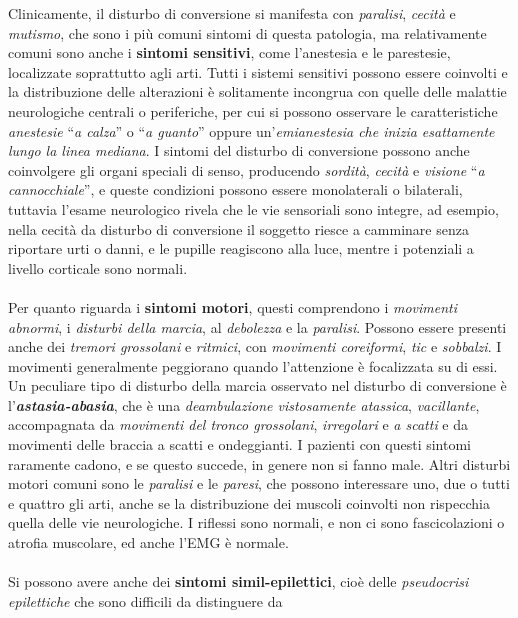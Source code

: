 Clinicamente, il disturbo di conversione si manifesta con
\emph{paralisi}, \emph{cecità} e \emph{mutismo}, che sono i più comuni
sintomi di questa patologia, ma relativamente comuni sono anche i
\textbf{sintomi sensitivi}, come l'anestesia e le parestesie,
localizzate soprattutto agli arti. Tutti i sistemi sensitivi possono
essere coinvolti e la distribuzione delle alterazioni è solitamente
incongrua con quelle delle malattie neurologiche centrali o periferiche,
per cui si possono osservare le caratteristiche \emph{anestesie}
``\emph{a calza}'' o ``\emph{a guanto}'' oppure un'\emph{emianestesia
che inizia esattamente lungo la linea mediana}. I sintomi del disturbo
di conversione possono anche coinvolgere gli organi speciali di senso,
producendo \emph{sordità}, \emph{cecità} e \emph{visione} ``\emph{a
cannocchiale}'', e queste condizioni possono essere monolaterali o
bilaterali, tuttavia l'esame neurologico rivela che le vie sensoriali
sono integre, ad esempio, nella cecità da disturbo di conversione il
soggetto riesce a camminare senza riportare urti o danni, e le pupille
reagiscono alla luce, mentre i potenziali a livello corticale sono
normali.
\\\\
Per quanto riguarda i \textbf{sintomi motori}, questi comprendono i
\emph{movimenti abnormi}, i \emph{disturbi della marcia}, al
\emph{debolezza} e la \emph{paralisi}. Possono essere presenti anche dei
\emph{tremori grossolani} e \emph{ritmici}, con \emph{movimenti
coreiformi}, \emph{tic} e \emph{sobbalzi}. I movimenti generalmente
peggiorano quando l'attenzione è focalizzata su di essi. Un peculiare
tipo di disturbo della marcia osservato nel disturbo di conversione è
l'\textbf{\emph{astasia-abasia}}, che è una \emph{deambulazione
vistosamente atassica}, \emph{vacillante}, accompagnata da
\emph{movimenti del tronco grossolani}, \emph{irregolari} e \emph{a
scatti} e da movimenti delle braccia a scatti e ondeggianti. I pazienti
con questi sintomi raramente cadono, e se questo succede, in genere non
si fanno male. Altri disturbi motori comuni sono le \emph{paralisi} e le
\emph{paresi}, che possono interessare uno, due o tutti e quattro gli
arti, anche se la distribuzione dei muscoli coinvolti non rispecchia
quella delle vie neurologiche. I riflessi sono normali, e non ci sono
fascicolazioni o atrofia muscolare, ed anche l'EMG è normale.
\\\\
Si possono avere anche dei \textbf{sintomi simil-epilettici}, cioè delle
\emph{pseudocrisi epilettiche} che sono difficili da distinguere da

